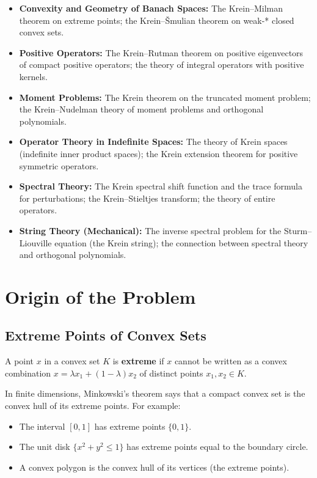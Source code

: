 \begin{itemize}
    \item \textbf{Convexity and Geometry of Banach Spaces:} The Krein--Milman theorem on extreme points; the Krein--{\v S}mulian theorem on weak-* closed convex sets.
    \item \textbf{Positive Operators:} The Krein--Rutman theorem on positive eigenvectors of compact positive operators; the theory of integral operators with positive kernels.
    \item \textbf{Moment Problems:} The Krein theorem on the truncated moment problem; the Krein--Nudelman theory of moment problems and orthogonal polynomials.
    \item \textbf{Operator Theory in Indefinite Spaces:} The theory of Krein spaces (indefinite inner product spaces); the Krein extension theorem for positive symmetric operators.
    \item \textbf{Spectral Theory:} The Krein spectral shift function and the trace formula for perturbations; the Krein--Stieltjes transform; the theory of entire operators.
    \item \textbf{String Theory (Mechanical):} The inverse spectral problem for the Sturm--Liouville equation (the Krein string); the connection between spectral theory and orthogonal polynomials.
\end{itemize}

\section{Origin of the Problem}

\subsection{Extreme Points of Convex Sets}

A point $x$ in a convex set $K$ is \textbf{extreme} if $x$ cannot be written as a convex combination $x = \lambda x_1 + (1-\lambda)x_2$ of distinct points $x_1, x_2 \in K$.

In finite dimensions, Minkowski's theorem says that a compact convex set is the convex hull of its extreme points. For example:
\begin{itemize}
    \item The interval $[0,1]$ has extreme points $\{0,1\}$.
    \item The unit disk $\{x^2 + y^2 \leq 1\}$ has extreme points equal to the boundary circle.
    \item A convex polygon is the convex hull of its vertices (the extreme points).
\end{itemize}

